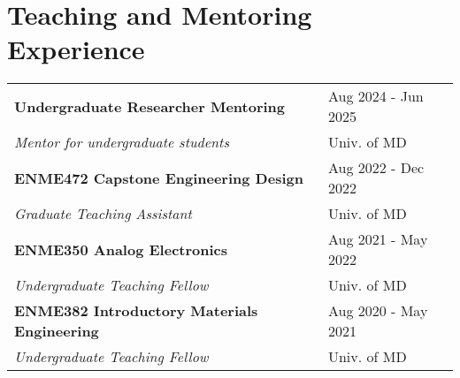 \documentclass[letterpaper, 11pt]{article}
\begin{document}
\section{Teaching and Mentoring Experience}
\begin{table}[H]
    \centering
    \begin{tabular}{L{0.7\textwidth} R{0.2\textwidth}}
    	\textbf{Undergraduate Researcher Mentoring} & Aug 2024 - Jun 2025 \\
    	\hspace{5pt} \textit{Mentor for undergraduate students} & Univ. of MD \\

        \textbf{ENME472 Capstone Engineering Design} & Aug 2022 - Dec 2022 \\
        \hspace{5pt} \textit{Graduate Teaching Assistant} &  Univ. of MD\\

        \textbf{ENME350 Analog Electronics} & Aug 2021 - May 2022 \\
        \hspace{5pt} \textit{Undergraduate Teaching Fellow} & Univ. of MD\\


        \textbf{ENME382 Introductory Materials Engineering} & Aug 2020 - May 2021 \\
        \hspace{5pt} \textit{Undergraduate Teaching Fellow} & Univ. of MD\\

    \end{tabular}
\end{table}

\end{document}
